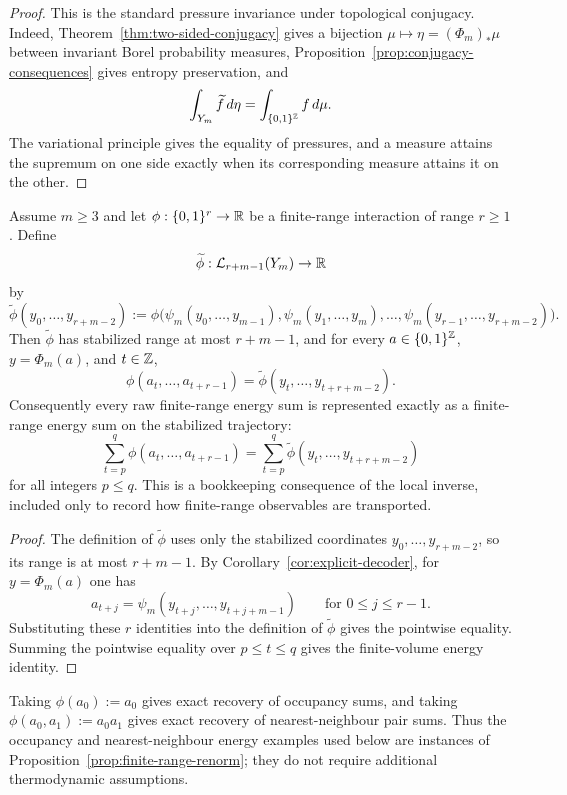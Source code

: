 \begin{proof}
This is the standard pressure invariance under topological conjugacy. Indeed,
Theorem~\ref{thm:two-sided-conjugacy} gives a bijection
$\mu\mapsto\eta=(\Phi_m)_*\mu$ between invariant Borel probability measures,
Proposition~\ref{prop:conjugacy-consequences} gives entropy preservation, and
\[
\int_{Y_m}\widetilde f\,d\eta
=
\int_{\{0,1\}^{\mathbb{Z}}} f\,d\mu .
\]
The variational principle \cite{Walters1982} gives the equality of pressures,
and a measure attains the supremum on one side exactly when its corresponding
measure attains it on the other.
\end{proof}

\begin{proposition}\label{prop:finite-range-renorm}
Assume $m\ge3$ and let $\phi:\{0,1\}^r\to\mathbb{R}$ be a finite-range interaction
of range $r\ge1$.  Define
\[
\widetilde\phi:\mathcal L_{r+m-1}(Y_m)\to\mathbb{R}
\]
by
\[
\widetilde\phi(y_0,\ldots,y_{r+m-2})
:=
\phi\bigl(
\psi_m(y_0,\ldots,y_{m-1}),
\psi_m(y_1,\ldots,y_m),
\ldots,
\psi_m(y_{r-1},\ldots,y_{r+m-2})
\bigr).
\]
Then $\widetilde\phi$ has stabilized range at most $r+m-1$, and for every
$a\in\{0,1\}^{\mathbb{Z}}$, $y=\Phi_m(a)$, and $t\in\mathbb{Z}$,
\[
\phi(a_t,\ldots,a_{t+r-1})
=
\widetilde\phi(y_t,\ldots,y_{t+r+m-2}).
\]
Consequently every raw finite-range energy sum is represented exactly as a
finite-range energy sum on the stabilized trajectory:
\[
\sum_{t=p}^{q}\phi(a_t,\ldots,a_{t+r-1})
=
\sum_{t=p}^{q}\widetilde\phi(y_t,\ldots,y_{t+r+m-2})
\]
for all integers $p\le q$.
This is a bookkeeping consequence of the local inverse, included only to
record how finite-range observables are transported.
\end{proposition}

\begin{proof}
The definition of $\widetilde\phi$ uses only the stabilized coordinates
$y_0,\ldots,y_{r+m-2}$, so its range is at most $r+m-1$.  By
Corollary~\ref{cor:explicit-decoder}, for $y=\Phi_m(a)$ one has
\[
a_{t+j}=\psi_m(y_{t+j},\ldots,y_{t+j+m-1})
\qquad\text{for }0\le j\le r-1.
\]
Substituting these $r$ identities into the definition of $\widetilde\phi$
gives the pointwise equality.  Summing the pointwise equality over
$p\le t\le q$ gives the finite-volume energy identity.
\end{proof}

\begin{remark}
Taking $\phi(a_0):=a_0$ gives exact recovery of occupancy sums, and taking
$\phi(a_0,a_1):=a_0a_1$ gives exact recovery of nearest-neighbour pair sums.
Thus the occupancy and nearest-neighbour energy examples used below are
instances of Proposition~\ref{prop:finite-range-renorm}; they do not require
additional thermodynamic assumptions.
\end{remark}

